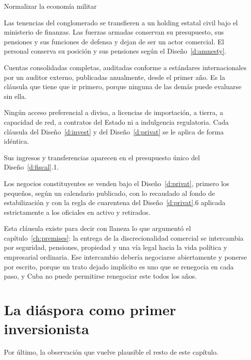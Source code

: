 \begin{design}{Normalizar la economía militar}
\label{d:gaesa}
\begin{rules}
 Las tenencias del conglomerado se transfieren a un holding estatal civil
bajo el ministerio de finanzas. Las fuerzas armadas conservan su presupuesto, sus pensiones y sus
funciones de defensa y dejan de ser un actor comercial. El personal conserva su posición y sus
pensiones según el Diseño~\ref{d:amnesty}.

 Cuentas consolidadas completas, auditadas conforme a
estándares internacionales por un auditor externo, publicadas anualmente, desde el primer año. Es
la cláusula que tiene que ir primero, porque ninguna de las demás puede evaluarse sin ella.

 Ningún acceso preferencial a divisa, a licencias de importación, a
tierra, a capacidad de red, a contratos del Estado ni a indulgencia regulatoria. Cada cláusula del
Diseño~\ref{d:invest} y del Diseño~\ref{d:privat} se le aplica de forma idéntica.

 Sus ingresos y transferencias aparecen en el presupuesto único del
Diseño~\ref{d:fiscal}.1.

 Los negocios constituyentes se venden bajo el
Diseño~\ref{d:privat}, primero los pequeños, según un calendario publicado, con lo recaudado al
fondo de estabilización y con la regla de cuarentena del Diseño~\ref{d:privat}.6 aplicada
estrictamente a los oficiales en activo y retirados.

 Esta cláusula existe para decir con llaneza lo que argumentó el
capítulo~\ref{ch:premises}: la entrega de la discrecionalidad comercial se intercambia por
seguridad, pensiones, propiedad y una vía legal hacia la vida política y empresarial ordinaria.
Ese intercambio debería negociarse abiertamente y ponerse por escrito, porque un trato dejado
implícito es uno que se renegocia en cada paso, y Cuba no puede permitirse renegociar este todos
los años.
\end{rules}
\end{design}

\section{La diáspora como primer inversionista}

Por último, la observación que vuelve plausible el resto de este capítulo.

